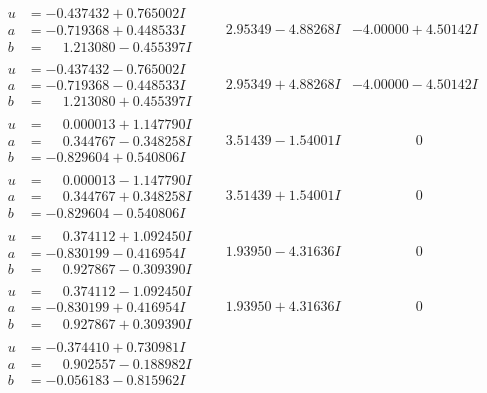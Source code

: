 \documentclass[1p]{elsarticle_modified}
\theoremstyle{definition}
\begin{document}
$$\begin{array}{c|c|c}
\begin{aligned}
u &= -0.437432 + 0.765002 I \\
a &= -0.719368 + 0.448533 I \\
b &= \phantom{-}1.213080 - 0.455397 I\end{aligned}
 & \phantom{-}2.95349 - 4.88268 I & -4.00000 + 4.50142 I \\ \hline\begin{aligned}
u &= -0.437432 - 0.765002 I \\
a &= -0.719368 - 0.448533 I \\
b &= \phantom{-}1.213080 + 0.455397 I\end{aligned}
 & \phantom{-}2.95349 + 4.88268 I & -4.00000 - 4.50142 I \\ \hline\begin{aligned}
u &= \phantom{-}0.000013 + 1.147790 I \\
a &= \phantom{-}0.344767 - 0.348258 I \\
b &= -0.829604 + 0.540806 I\end{aligned}
 & \phantom{-}3.51439 - 1.54001 I & \phantom{-0.000000 } 0 \\ \hline\begin{aligned}
u &= \phantom{-}0.000013 - 1.147790 I \\
a &= \phantom{-}0.344767 + 0.348258 I \\
b &= -0.829604 - 0.540806 I\end{aligned}
 & \phantom{-}3.51439 + 1.54001 I & \phantom{-0.000000 } 0 \\ \hline\begin{aligned}
u &= \phantom{-}0.374112 + 1.092450 I \\
a &= -0.830199 - 0.416954 I \\
b &= \phantom{-}0.927867 - 0.309390 I\end{aligned}
 & \phantom{-}1.93950 - 4.31636 I & \phantom{-0.000000 } 0 \\ \hline\begin{aligned}
u &= \phantom{-}0.374112 - 1.092450 I \\
a &= -0.830199 + 0.416954 I \\
b &= \phantom{-}0.927867 + 0.309390 I\end{aligned}
 & \phantom{-}1.93950 + 4.31636 I & \phantom{-0.000000 } 0 \\ \hline\begin{aligned}
u &= -0.374410 + 0.730981 I \\
a &= \phantom{-}0.902557 - 0.188982 I \\
b &= -0.056183 - 0.815962 I\end{aligned}

\end{array}$$
\end{document}
